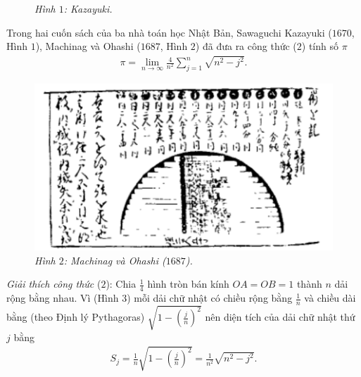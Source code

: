 \begin{multicols}{2}
\begin{figure}[H]
		\caption{\small\textit{\color{lichsutoanhoc}Hình $1$: Kazayuki.}}
		\vspace*{-10pt}
	\end{figure}
	Trong hai cuốn sách của ba nhà toán học Nhật Bản, Sawaguchi Kazayuki ($1670$, Hình $1$), Machinag và Ohashi ($1687$, Hình $2$) đã đưa ra công thức ($2$) tính số $\pi$ 
	\begin{align*}
		\pi  = \mathop {\lim }\limits_{n \to \infty } \frac{4}{{{n^2}}}\sum\limits_{j = 1}^n {\sqrt {{n^2} - {j^2}} }. \tag{$2$}
	\end{align*}
	 \begin{figure}[H]
	 	\vspace*{-5pt}
	 	\centering
	 	\captionsetup{labelformat= empty, justification=centering}
	 	\includegraphics[width= 1\linewidth]{2}
	 	\caption{\small\textit{\color{lichsutoanhoc}Hình $2$: Machinag và Ohashi ($1687$).}}
	 	\vspace*{-10pt}
	 \end{figure}
	\textit{Giải thích công thức} ($2$): Chia $\frac{1}{4}$ hình tròn bán kính $OA= OB = 1$  thành $n$ dải rộng bằng nhau. Vì (Hình $3$) mỗi dải chữ nhật có chiều rộng bằng $\frac{1}{n}$  và chiều dài bằng (theo Định lý Pythagoras) $\sqrt{1- \left(\frac{j}{n}\right)^2}$ nên diện tích của dải chữ nhật thứ  $j$ bằng	 
	\begin{align*}
		{S_j} = \frac{1}{n}\sqrt {1 - {{\left( {\frac{j}{n}} \right)}^2}}  = \frac{1}{{{n^2}}}\sqrt {{n^2} - {j^2}}.
	\end{align*}
	\begin{figure}[H]
		\vspace*{-5pt}
		\centering
		\captionsetup{labelformat= empty, justification=centering}

\end{figure}
\end{multicols}
